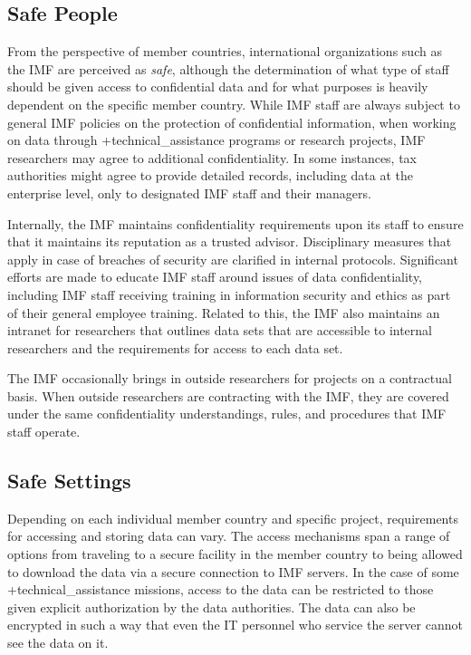 \documentclass[
]{book}
\begin{document}
\hypertarget{safe-people-8}{%
\subsection{Safe People}\label{safe-people-8}}

From the perspective of member countries, international organizations such as the IMF are perceived as \emph{safe}, although the determination of what type of staff should be given access to confidential data and for what purposes is heavily dependent on the specific member country. While IMF staff are always subject to general IMF policies on the protection of confidential information, when working on data through +technical\_assistance\textbar{} programs or research projects, IMF researchers may agree to additional confidentiality. In some instances, tax authorities might agree to provide detailed records, including data at the enterprise level, only to designated IMF staff and their managers.

Internally, the IMF maintains confidentiality requirements upon its staff to ensure that it maintains its reputation as a trusted advisor. Disciplinary measures that apply in case of breaches of security are clarified in internal protocols. Significant efforts are made to educate IMF staff around issues of data confidentiality, including IMF staff receiving training in information security and ethics as part of their general employee training. Related to this, the IMF also maintains an intranet for researchers that outlines data sets that are accessible to internal researchers and the requirements for access to each data set.

The IMF occasionally brings in outside researchers for projects on a contractual basis. When outside researchers are contracting with the IMF, they are covered under the same confidentiality understandings, rules, and procedures that IMF staff operate.

\hypertarget{safe-settings-8}{%
\subsection{Safe Settings}\label{safe-settings-8}}

Depending on each individual member country and specific project, requirements for accessing and storing data can vary. The access mechanisms span a range of options from traveling to a secure facility in the member country to being allowed to download the data via a secure connection to IMF servers. In the case of some +technical\_assistance\textbar{} missions, access to the data can be restricted to those given explicit authorization by the data authorities. The data can also be encrypted in such a way that even the IT personnel who service the server cannot see the data on it.
\end{document}
